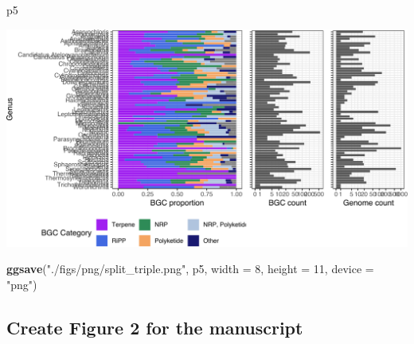 \documentclass[
]{article}
\newenvironment{Shaded}{\begin{snugshade}}{\end{snugshade}}
\newcommand{\AttributeTok}[1]{\textcolor[rgb]{0.13,0.29,0.53}{#1}}
\newcommand{\DecValTok}[1]{\textcolor[rgb]{0.00,0.00,0.81}{#1}}
\newcommand{\FunctionTok}[1]{\textcolor[rgb]{0.13,0.29,0.53}{\textbf{#1}}}
\newcommand{\NormalTok}[1]{#1}
\newcommand{\StringTok}[1]{\textcolor[rgb]{0.31,0.60,0.02}{#1}}
\begin{document}
\begin{Shaded}
\begin{Highlighting}[]
\NormalTok{p5}
\end{Highlighting}
\end{Shaded}

\includegraphics{analysis_files/figure-latex/unnamed-chunk-15-1.pdf}

\begin{Shaded}
\begin{Highlighting}[]
\FunctionTok{ggsave}\NormalTok{(}\StringTok{"./figs/png/split\_triple.png"}\NormalTok{, p5, }\AttributeTok{width =} \DecValTok{8}\NormalTok{, }\AttributeTok{height =} \DecValTok{11}\NormalTok{, }\AttributeTok{device =} \StringTok{"png"}\NormalTok{)}
\end{Highlighting}
\end{Shaded}

\hypertarget{create-figure-2-for-the-manuscript}{%
\subsection{Create Figure 2 for the
manuscript}\label{create-figure-2-for-the-manuscript}}
\end{document}
